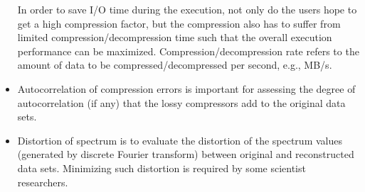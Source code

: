 \begin{itemize}
In order to save I/O time during the execution, not only do the users hope to get a high compression factor, but the compression also has to suffer from limited compression/decompression time such that the overall execution performance can be maximized.
Compression/decompression rate refers to the amount of data to be compressed/decompressed per second, e.g., MB/s.
\item Autocorrelation of compression errors is important for assessing the degree of autocorrelation (if any) that the lossy compressors add to the original data sets.
\item Distortion of spectrum is to evaluate the distortion of the spectrum values (generated by discrete Fourier transform) between original and reconstructed data sets.
Minimizing such distortion is required by some scientist researchers.
\end{itemize}



